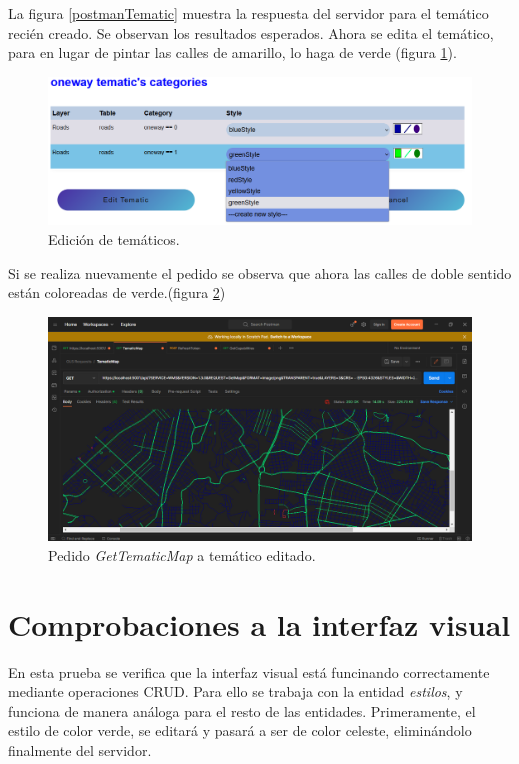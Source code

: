 La figura \ref{postmanTematic} muestra la respuesta del servidor para el tem\'atico reci\'en creado. Se observan los resultados esperados. Ahora se edita el tem\'atico, para en lugar de pintar las calles de amarillo, lo haga de verde (figura \ref{editTematic}).

\begin{figure}[h]
\centering
\label{editTematic}
\includegraphics[scale=0.4]{images/editTematic.png} 
\caption{Edici\'on de tem\'aticos.}
\end{figure}

Si se realiza nuevamente el pedido se observa que ahora las calles de doble sentido est\'an coloreadas de verde.(figura \ref{postman2})

\begin{figure}[h]
\centering
\label{postman2}
\includegraphics[scale=0.4]{images/postmanTematic2.png} 
\caption{Pedido \textit{GetTematicMap} a tem\'atico editado.}
\vspace{5cm}
\end{figure}



\section{Comprobaciones a la interfaz visual}
En esta prueba se verifica que la interfaz visual est\'a funcinando correctamente mediante operaciones CRUD. Para ello se trabaja con la entidad \textit{estilos}, y funciona de manera an\'aloga para el resto de las entidades. Primeramente, el estilo de color verde, se editar\'a y pasar\'a a ser de color celeste, elimin\'andolo finalmente del servidor.

